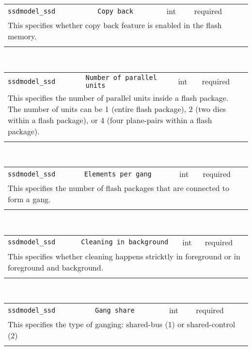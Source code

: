 \noindent 
\begin{tabular}{|p{\lpmodwidth}|p{\lpnamewidth}|p{0.5in}|p{0.5in}|}
\cline{1-4}
\texttt{ssdmodel\_ssd} & \texttt{Copy back} & int & required \\ 
\cline{1-4}
\multicolumn{4}{|p{6in}|}{
This specifies whether copy back feature is enabled in the flash memory.
}\\ 
\cline{1-4}
\multicolumn{4}{p{5in}}{}\\
\end{tabular}\\ 
\noindent 
\begin{tabular}{|p{\lpmodwidth}|p{\lpnamewidth}|p{0.5in}|p{0.5in}|}
\cline{1-4}
\texttt{ssdmodel\_ssd} & \texttt{Number of parallel units} & int & required \\ 
\cline{1-4}
\multicolumn{4}{|p{6in}|}{
This specifies the number of parallel units inside a flash package.
The number of units can be 1 (entire flash package), 2 (two dies within
a flash package), or 4 (four plane-pairs within a flash package).
}\\ 
\cline{1-4}
\multicolumn{4}{p{5in}}{}\\
\end{tabular}\\ 
\noindent 
\begin{tabular}{|p{\lpmodwidth}|p{\lpnamewidth}|p{0.5in}|p{0.5in}|}
\cline{1-4}
\texttt{ssdmodel\_ssd} & \texttt{Elements per gang} & int & required \\ 
\cline{1-4}
\multicolumn{4}{|p{6in}|}{
This specifies the number of flash packages that are connected to
form a gang.
}\\ 
\cline{1-4}
\multicolumn{4}{p{5in}}{}\\
\end{tabular}\\ 
\noindent 
\begin{tabular}{|p{\lpmodwidth}|p{\lpnamewidth}|p{0.5in}|p{0.5in}|}
\cline{1-4}
\texttt{ssdmodel\_ssd} & \texttt{Cleaning in background} & int & required \\ 
\cline{1-4}
\multicolumn{4}{|p{6in}|}{
This specifies whether cleaning happens stricktly in foreground
or in foreground and background.
}\\ 
\cline{1-4}
\multicolumn{4}{p{5in}}{}\\
\end{tabular}\\ 
\noindent 
\begin{tabular}{|p{\lpmodwidth}|p{\lpnamewidth}|p{0.5in}|p{0.5in}|}
\cline{1-4}
\texttt{ssdmodel\_ssd} & \texttt{Gang share} & int & required \\ 
\cline{1-4}
\multicolumn{4}{|p{6in}|}{
This specifies the type of ganging: shared-bus (1) or shared-control (2)
}\\ 
\cline{1-4}
\multicolumn{4}{p{5in}}{}\\
\end{tabular}\\ 
